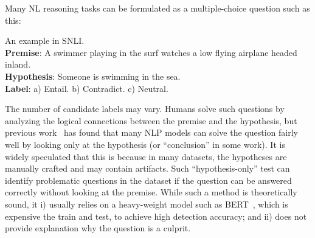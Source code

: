 Many NL reasoning tasks can be formulated as a multiple-choice question
such as this:
\begin{example}\label{exp:snli}
An example in SNLI.\\

\noindent
\textbf{Premise}: A swimmer playing in the surf watches a low flying airplane headed inland. \\

\noindent
\textbf{Hypothesis}: Someone is swimming in the sea.\\

\noindent
\textbf{Label}: a) Entail. b) Contradict.  c) Neutral.
\end{example}
The number of candidate labels may vary. Humans solve such questions by
analyzing the logical connections between the premise and the hypothesis,
but previous work~\cite{naik2018stress,schuster2019towards} 
has found that many NLP models can solve the question
fairly well by looking only at the hypothesis (or ``conclusion'' in some work).
It is widely speculated that this is because in many datasets, 
the hypotheses are manually crafted
and may contain artifacts.
Such ``hypothesis-only'' test can identify problematic questions in the dataset
if the question can be answered correctly without looking at the premise. While
such a method is theoretically sound, 
it i) usually relies on a heavy-weight model such as BERT~\cite{devlin2018bert}, which is
expensive the train and test, to achieve high detection accuracy; 
and ii) does not provide explanation why the question is a culprit.  

